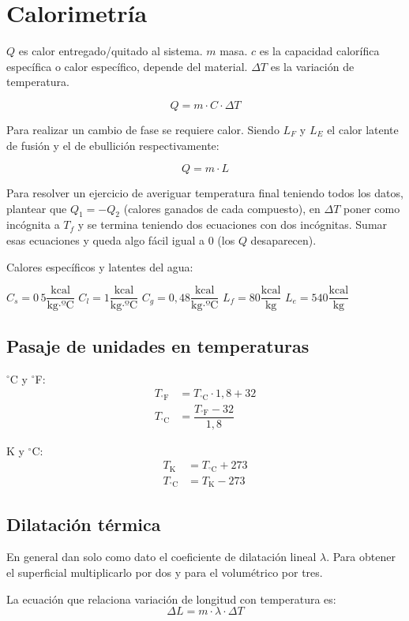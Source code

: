 \section{Calorimetría}

$Q$ es calor entregado/quitado al sistema. $m$ masa. $c$ es la capacidad calorífica específica o calor específico, depende del material. $\Delta T$ es la variación de temperatura.

$$ Q = m \cdot C \cdot \Delta T$$

Para realizar un cambio de fase se requiere calor. Siendo $L_F$ y $L_E$ el calor latente de fusión y el de ebullición respectivamente:

$$Q = m \cdot L$$

Para resolver un ejercicio de averiguar temperatura final teniendo todos los datos, plantear que $Q_1=-Q_2$ (calores ganados de cada compuesto), en $\Delta T$ poner como incógnita a $T_f$ y se termina teniendo dos ecuaciones con dos incógnitas. Sumar esas ecuaciones y queda algo fácil igual a 0 (los $Q$ desaparecen).

\skipline
Calores específicos y latentes del agua:

\vspace{0.5\baselineskip}
\hfil
$C_s=0\,5 \dfrac{\text{kcal}}{\text{kg} \cdot \text{ºC}}$\hfil
$C_l=1 \dfrac{\text{kcal}}{\text{kg} \cdot \text{ºC}}$\hfil
$C_g=0,48 \dfrac{\text{kcal}}{\text{kg} \cdot \text{ºC}}$\hfil
$L_f = 80 \dfrac{\text{kcal}}{\text{kg}}$\hfil
$L_e = 540 \dfrac{\text{kcal}}{\text{kg}}$\hfil


\subsection*{Pasaje de unidades en temperaturas}

\begin{multicols}{2}
$^\circ$C y $^\circ$F:
\vspace{-\baselineskip}
\begin{align*}
T_{^\circ\text{F}}&= T_{\text{$^\circ$C}} \cdot 1,8 + 32\\
T_{\text{$^\circ$C}} &= \dfrac{T_{^\circ\text{F}}-32}{1,8}
\end{align*}

K y $^\circ$C:
\vspace{-\baselineskip}
\begin{align*}
T_{\text{K}}&=T_{\text{$^\circ$C}} + 273\\
T_{\text{$^\circ$C}} &=  T_{\text{K}} - 273
\end{align*}
\end{multicols}

\subsection*{Dilatación térmica}

En general dan solo como dato el coeficiente de dilatación lineal $\lambda$. Para obtener el superficial multiplicarlo por dos y para el volumétrico por tres.

La ecuación que relaciona variación de longitud con temperatura es:
$$\Delta L = m \cdot \lambda \cdot \Delta T$$